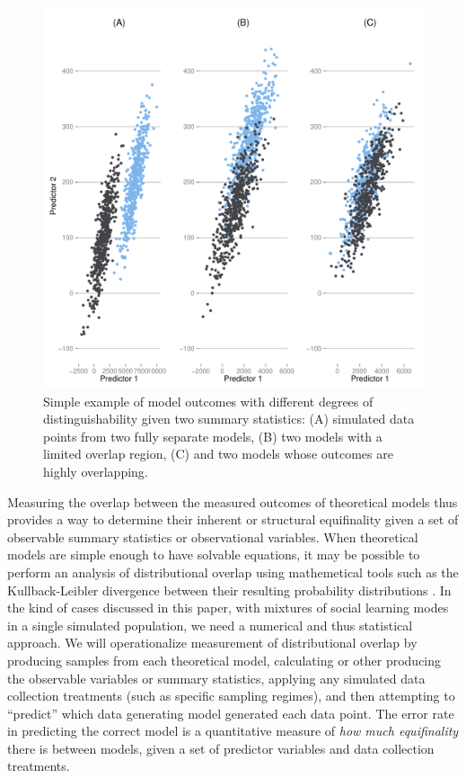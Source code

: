 \begin{figure}[ht]
\centering
\includegraphics[scale=0.6]{graphics/ctmixtures/distributional-overlap.pdf}
\caption{Simple example of model outcomes with different degrees of distinguishability given two summary statistics: (A) simulated data points from two fully separate models, (B) two models with a limited overlap region, (C) and two models whose outcomes are highly overlapping.}
\label{ctmixtures:fig:distributional-scenarios}
\end{figure}

Measuring the overlap between the measured outcomes of theoretical models thus provides a way to determine their inherent or structural equifinality given a set of observable summary statistics or observational variables.  When theoretical models are simple enough to have solvable equations, it may be possible to perform an analysis of distributional overlap using mathemetical tools such as the Kullback-Leibler divergence between their resulting probability distributions \citep{burnham2002model}.  In the kind of cases discussed in this paper, with mixtures of social learning modes in a single simulated population, we need a numerical and thus statistical approach.  We will operationalize measurement of distributional overlap by producing samples from each theoretical model, calculating or other producing the observable variables or summary statistics, applying any simulated data collection treatments (such as specific sampling regimes), and then attempting to ``predict'' which data generating model generated each data point.  The error rate in predicting the correct model is a quantitative measure of \emph{how much equifinality} there is between models, given a set of predictor variables and data collection treatments.  

